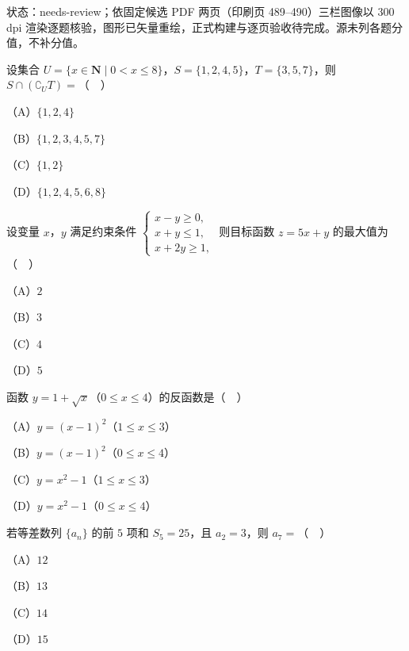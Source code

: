 

状态：needs-review；依固定候选 PDF 两页（印刷页 489–490）三栏图像以 300 dpi 渲染逐题核验，图形已矢量重绘，正式构建与逐页验收待完成。源未列各题分值，不补分值。


\begin{question}
设集合 $U=\{x\in\mathbf N\mid0<x\leqslant8\}$，$S=\{1,2,4,5\}$，$T=\{3,5,7\}$，则 $S\cap(\complement_UT)=$（　）

（A）$\{1,2,4\}$

（B）$\{1,2,3,4,5,7\}$

（C）$\{1,2\}$

（D）$\{1,2,4,5,6,8\}$

\end{question}
\begin{question}
设变量 $x$，$y$ 满足约束条件 $\begin{cases}x-y\geqslant0,\\ x+y\leqslant1,\\ x+2y\geqslant1,\end{cases}$ 则目标函数 $z=5x+y$ 的最大值为（　）

（A）$2$

（B）$3$

（C）$4$

（D）$5$

\end{question}
\begin{question}
函数 $y=1+\sqrt x$（$0\leqslant x\leqslant4$）的反函数是（　）

（A）$y=(x-1)^2$（$1\leqslant x\leqslant3$）

（B）$y=(x-1)^2$（$0\leqslant x\leqslant4$）

（C）$y=x^2-1$（$1\leqslant x\leqslant3$）

（D）$y=x^2-1$（$0\leqslant x\leqslant4$）

\end{question}
\begin{question}
若等差数列 $\{a_n\}$ 的前 $5$ 项和 $S_5=25$，且 $a_2=3$，则 $a_7=$（　）

（A）$12$

（B）$13$

（C）$14$

（D）$15$

\end{question}
